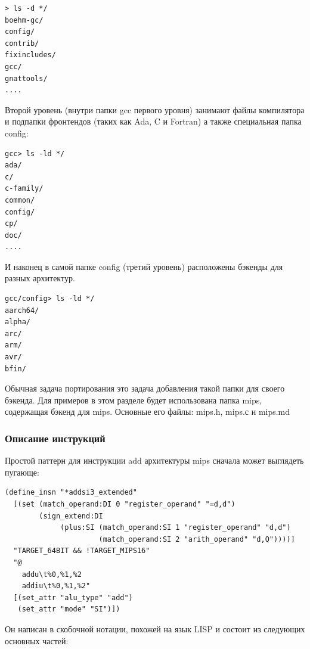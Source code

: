 \documentclass[a4paper,12pt,oneside]{article}
\begin{document}
\begin{verbatim}
> ls -d */
boehm-gc/
config/
contrib/
fixincludes/
gcc/
gnattools/
....
\end{verbatim}

Второй уровень (внутри папки gcc первого уровня) занимают файлы компилятора и подпапки фронтендов (таких как Ada, C и Fortran) а также специальная папка config:

\begin{verbatim}
gcc> ls -ld */
ada/
c/
c-family/
common/
config/
cp/
doc/
....
\end{verbatim}

И наконец в самой папке config (третий уровень) расположены бэкенды для разных архитектур.

\begin{verbatim}
gcc/config> ls -ld */
aarch64/
alpha/
arc/
arm/
avr/
bfin/
\end{verbatim}

Обычная задача портирования это задача добавления такой папки для своего бэкенда. Для примеров в этом разделе будет использована папка mips, содержащая бэкенд для mips. Основные его файлы: mips.h, mips.с и mips.md

\subsubsection{Описание инструкций}

Простой паттерн для инструкции add архитектуры mips сначала может выглядеть пугающе:

\begin{verbatim}
(define_insn "*addsi3_extended"
  [(set (match_operand:DI 0 "register_operand" "=d,d")
        (sign_extend:DI
             (plus:SI (match_operand:SI 1 "register_operand" "d,d")
                      (match_operand:SI 2 "arith_operand" "d,Q"))))]
  "TARGET_64BIT && !TARGET_MIPS16"
  "@
    addu\t%0,%1,%2
    addiu\t%0,%1,%2"
  [(set_attr "alu_type" "add")
   (set_attr "mode" "SI")])
\end{verbatim}

Он написан в скобочной нотации, похожей на язык LISP и состоит из следующих основных частей:
\end{document}
